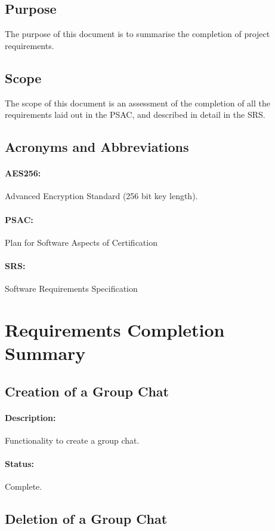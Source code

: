 \documentclass[11pt]{article}
\begin{document}
\subsection{Purpose}
The purpose of this document is to summarise the completion of project requirements.

\subsection{Scope}
The scope of this document is an assessment of the completion of all the requirements laid out in the PSAC, and described in detail in the SRS. 

\subsection{Acronyms and Abbreviations}
\paragraph{AES256:} Advanced Encryption Standard (256 bit key length).
\paragraph{PSAC:} Plan for Software Aspects of Certification
\paragraph{SRS:} Software Requirements Specification

\section{Requirements Completion Summary}

\subsection{Creation of a Group Chat}
\paragraph{Description:} Functionality to create a group chat.
\paragraph{Status:} Complete.

\subsection{Deletion of a Group Chat}
\end{document}
